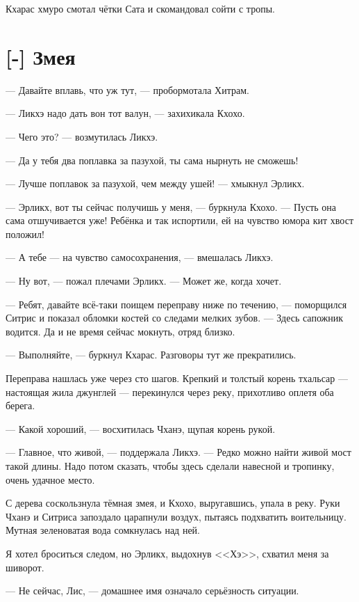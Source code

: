 Кхарас хмуро смотал чётки Сата и скомандовал сойти с тропы.

\section{[-] Змея}

--- Давайте вплавь, что уж тут, --- пробормотала Хитрам.

--- Ликхэ надо дать вон тот валун, --- захихикала Кхохо.

--- Чего это? --- возмутилась Ликхэ.

--- Да у тебя два поплавка за пазухой, ты сама нырнуть не сможешь!

--- Лучше поплавок за пазухой, чем между ушей! --- хмыкнул Эрликх.

--- Эрликх, вот ты сейчас получишь у меня, --- буркнула Кхохо.
--- Пусть она сама отшучивается уже!
Ребёнка и так испортили, ей на чувство юмора кит хвост положил!

--- А тебе --- на чувство самосохранения, --- вмешалась Ликхэ.

--- Ну вот, --- пожал плечами Эрликх.
--- Может же, когда хочет.

--- Ребят, давайте всё-таки поищем переправу ниже по течению, --- поморщился Ситрис и показал обломки костей со следами мелких зубов.
--- Здесь сапожник водится.
Да и не время сейчас мокнуть, отряд близко.

--- Выполняйте, --- буркнул Кхарас.
Разговоры тут же прекратились.

\asterism

Переправа нашлась уже через сто шагов.
Крепкий и толстый корень тхальсар --- настоящая жила джунглей --- перекинулся через реку, прихотливо оплетя оба берега.

--- Какой хороший, --- восхитилась Чханэ, щупая корень рукой.

--- Главное, что живой, --- поддержала Ликхэ.
--- Редко можно найти живой мост такой длины.
Надо потом сказать, чтобы здесь сделали навесной и тропинку, очень удачное место.

С дерева соскользнула тёмная змея, и Кхохо, выругавшись, упала в реку.
Руки Чханэ и Ситриса запоздало царапнули воздух, пытаясь подхватить воительницу.
Мутная зеленоватая вода сомкнулась над ней.

Я хотел броситься следом, но Эрликх, выдохнув <<Хэ>>, схватил меня за шиворот.

--- Не сейчас, Лис, --- домашнее имя означало серьёзность ситуации.

